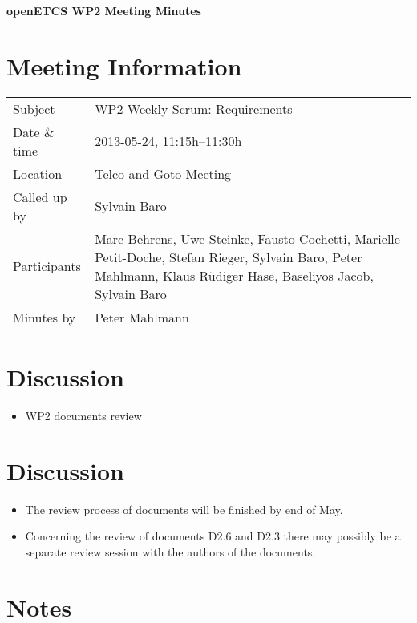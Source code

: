 \documentclass[a4paper, 11pt]{article}
\begin{document}
{\begin{center}\huge\bf openETCS WP2 Meeting Minutes\end{center}}
\section{Meeting Information}

\renewcommand{\arraystretch}{1.5}
\begin{supertabular}{m{.2\textwidth}m{.8\textwidth}}
Subject & WP2 Weekly Scrum: Requirements\\
Date \& time & 2013-05-24, 11:15h--11:30h\\
Location & Telco and Goto-Meeting\\
Called up by & Sylvain Baro\\
Participants &
Marc Behrens,
Uwe Steinke,
Fausto Cochetti,
Marielle Petit-Doche,
Stefan Rieger,
Sylvain Baro,
Peter Mahlmann,
Klaus R\"udiger Hase,
Baseliyos Jacob,
Sylvain Baro\\

Minutes by & Peter Mahlmann\\

\end{supertabular}
\renewcommand{\arraystretch}{1.0}


\section{{Discussion}}

\begin{itemize}
\item WP2 documents review
\end{itemize}

\section{{Discussion}}

\begin{itemize}
\item The review process of documents will be finished by end of May.
\item Concerning the review of documents D2.6 and D2.3 there may possibly be a separate review session with the authors of the documents.
\end{itemize}

\section{Notes}
\end{document}
